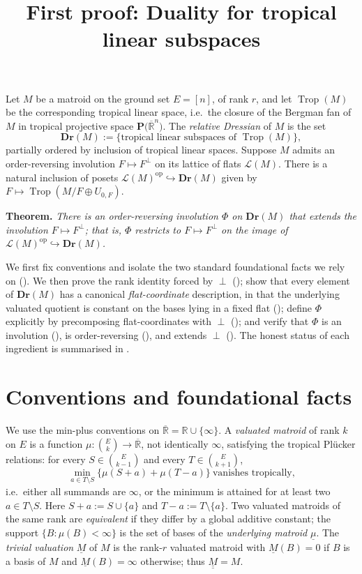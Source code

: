 \documentclass{article}
\title{First proof: Duality for tropical linear subspaces}
\author{}
\date{}
\theoremstyle{definition}
\newcommand{\Rbar}{\overline{\mathbb{R}}}
\newcommand{\R}{\mathbb{R}}
\newcommand{\Trop}{\operatorname{Trop}}
\newcommand{\op}{\operatorname{op}}
\newcommand{\into}{\hookrightarrow}
\newcommand{\Dr}{\mathbf{Dr}}
\newcommand{\cLL}{\mathcal{L}}
\newcommand{\PT}[1]{\mathbf{P}\big(\Rbar^{#1}\big)}
\begin{document}
\maketitle

\noindent
Let $M$ be a matroid on the ground set $E=[n]$, of rank $r$, and let $\Trop(M)$ be the
corresponding tropical linear space, i.e.\ the closure of the Bergman fan of $M$ in tropical
projective space $\PT{n}$. The \emph{relative Dressian} of $M$ is the set
\[
  \Dr(M):=\{\text{tropical linear subspaces of }\Trop(M)\},
\]
partially ordered by inclusion of tropical linear spaces. Suppose $M$ admits an order-reversing
involution $F\mapsto F^{\perp}$ on its lattice of flats $\cLL(M)$. There is a natural inclusion of
posets $\cLL(M)^{\op}\into\Dr(M)$ given by $F\mapsto\Trop(M/F\oplus U_{0,F})$.

\medskip
\noindent\textbf{Theorem.} \emph{There is an order-reversing involution $\Phi$ on $\Dr(M)$ that
extends the involution $F\mapsto F^{\perp}$; that is, $\Phi$ restricts to $F\mapsto F^{\perp}$ on the
image of $\cLL(M)^{\op}\into\Dr(M)$.}

\medskip

We first fix conventions and isolate the two standard foundational facts we rely on
(). We then prove the rank identity forced by $\perp$ (); show that
every element of $\Dr(M)$ has a canonical \emph{flat-coordinate} description, in that the underlying
valuated quotient is constant on the bases lying in a fixed flat (); define
$\Phi$ explicitly by precomposing flat-coordinates with $\perp$ (); and verify that
$\Phi$ is an involution (), is order-reversing (), and extends $\perp$
(). The honest status of each ingredient is summarised in .

\section{Conventions and foundational facts}\label{ssec:found}

We use the min-plus conventions on $\Rbar=\R\cup\{\infty\}$. A \emph{valuated matroid} of rank $k$
on $E$ is a function $\mu\colon\binom{E}{k}\to\Rbar$, not identically $\infty$, satisfying the
tropical Pl\"ucker relations: for every $S\in\binom{E}{k-1}$ and every $T\in\binom{E}{k+1}$,
\begin{equation}\label{eqn:plucker}
  \min_{a\in T\setminus S}\bigl\{\mu(S+a)+\mu(T-a)\bigr\}\ \text{vanishes tropically,}
\end{equation}
i.e.\ either all summands are $\infty$, or the minimum is attained for at least two
$a\in T\setminus S$. Here $S+a:=S\cup\{a\}$ and $T-a:=T\setminus\{a\}$. Two valuated matroids of the
same rank are \emph{equivalent} if they differ by a global additive constant; the support
$\{B:\mu(B)<\infty\}$ is the set of bases of the \emph{underlying matroid} $\underline\mu$. The
\emph{trivial valuation} $\underline M$ of $M$ is the rank-$r$ valuated matroid with $\underline
M(B)=0$ if $B$ is a basis of $M$ and $\underline M(B)=\infty$ otherwise; thus
$\underline{\underline M}=M$.
\end{document}
